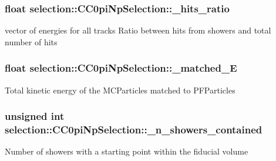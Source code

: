\subsubsection[{\texorpdfstring{\+\_\+hits\+\_\+ratio}{_hits_ratio}}]{\setlength{\rightskip}{0pt plus 5cm}float selection\+::\+C\+C0pi\+Np\+Selection\+::\+\_\+hits\+\_\+ratio\hspace{0.3cm}{\ttfamily [private]}}\hypertarget{classselection_1_1CC0piNpSelection_a32b43003c9168115bc94544049e439a2}{}\label{classselection_1_1CC0piNpSelection_a32b43003c9168115bc94544049e439a2}
vector of energies for all tracks Ratio between hits from showers and total number of hits 
\subsubsection[{\texorpdfstring{\+\_\+matched\+\_\+E}{_matched_E}}]{\setlength{\rightskip}{0pt plus 5cm}float selection\+::\+C\+C0pi\+Np\+Selection\+::\+\_\+matched\+\_\+E\hspace{0.3cm}{\ttfamily [private]}}\hypertarget{classselection_1_1CC0piNpSelection_ac75aa3ac33061bbdd378594ee7e6e2e5}{}\label{classselection_1_1CC0piNpSelection_ac75aa3ac33061bbdd378594ee7e6e2e5}
Total kinetic energy of the M\+C\+Particles matched to P\+F\+Particles 
\subsubsection[{\texorpdfstring{\+\_\+n\+\_\+showers\+\_\+contained}{_n_showers_contained}}]{\setlength{\rightskip}{0pt plus 5cm}unsigned int selection\+::\+C\+C0pi\+Np\+Selection\+::\+\_\+n\+\_\+showers\+\_\+contained\hspace{0.3cm}{\ttfamily [private]}}\hypertarget{classselection_1_1CC0piNpSelection_aebf4a69b8d7f3171ad90c382668c22ec}{}\label{classselection_1_1CC0piNpSelection_aebf4a69b8d7f3171ad90c382668c22ec}
Number of showers with a starting point within the fiducial volume 
